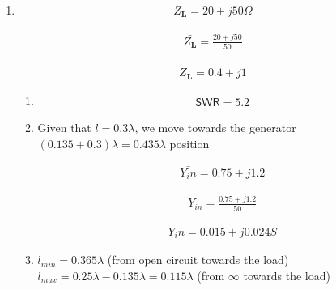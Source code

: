 \documentclass[12pt,a4paper,openright]{report}
\begin{document}
	\renewcommand{\theenumii}{\roman{enumii}}
	
	\begin{enumerate}
		\item
		
		\begin{align*}
		Z_\mathbf{L}=20+j50 \Omega
		\end{align*}
		
		\begin{align*}
		\bar{Z_\mathbf{L}}=\frac{20+j50 }{50}
		\end{align*}
		
		\begin{align*}
		\bar{Z_\mathbf{L}}=0.4+j1
		\end{align*}
		
		\begin{enumerate}
			\item 
			\begin{align*}
			\mathsf{SWR}=5.2
			\end{align*}

			\item 
			
			Given that $l=0.3\lambda$, we move towards the generator $(0.135+0.3)\lambda=0.435\lambda$ position
			
			\begin{align*}
			\bar{Y_in}=0.75+j1.2
			\end{align*}
			
			\therefore
			
			\begin{align*}
			Y_{in}=\frac{0.75+j1.2}{50}
			\end{align*}
			
			\begin{align*}
			Y_in=0.015+j0.024 S
			\end{align*}
			
			\item 
			$l_{min}=0.365\lambda$ (from open circuit towards the load)
			$l_{max}=0.25\lambda-0.135\lambda=0.115\lambda$ (from $\infty$ towards the load)
			
		\end{enumerate}
	\end{enumerate}
    
\end{document}
